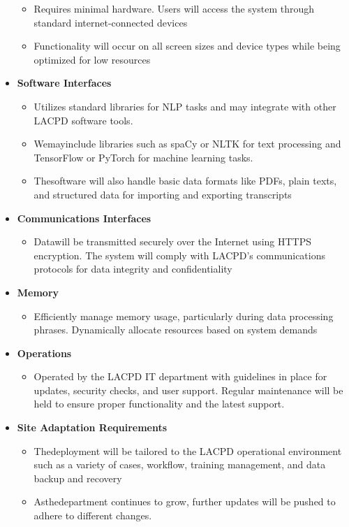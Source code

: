 \documentclass[12pt]{article}
\begin{document}
\begin{itemize}
\begin{itemize}
		\item Requires minimal hardware. Users will access the system through standard
			 internet-connected devices
		\item  Functionality will occur on all screen sizes and device types while being optimized for low resources
	\end{itemize}
    \item  \textbf{Software Interfaces}
	\begin{itemize}
		 \item    Utilizes standard libraries for NLP tasks and may integrate with other LACPD software tools.
		\item Wemayinclude libraries such as spaCy or NLTK for text processing and TensorFlow or PyTorch for machine learning tasks.
		\item  Thesoftware will also handle basic data formats like PDFs, plain texts, and structured data for importing and exporting transcripts
	\end{itemize}
    \item  \textbf{ Communications Interfaces}
	\begin{itemize}
		 \item    Datawill be transmitted securely over the Internet using HTTPS encryption. The system
 will comply with LACPD's communications protocols for data integrity and
 confidentiality
	\end{itemize}
    \item  \textbf{ Memory}
	\begin{itemize}
		 \item    Efficiently manage memory usage, particularly during data processing phrases.
 Dynamically allocate resources based on system demands
	\end{itemize}
    \item  \textbf{Operations}
	\begin{itemize}
		 \item    Operated by the LACPD IT department with guidelines in place for updates, security
 checks, and user support. Regular maintenance will be held to ensure proper functionality
 and the latest support.
	\end{itemize}
    \item  \textbf{ Site Adaptation Requirements}
	\begin{itemize}
		 \item    Thedeployment will be tailored to the LACPD operational environment such as a variety
 of cases, workflow, training management, and data backup and recovery
		\item Asthedepartment continues to grow, further updates will be pushed to adhere to different
 changes.
	\end{itemize}
\end{itemize}
\end{document}

